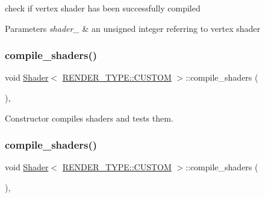check if vertex shader has been successfully compiled 


\begin{DoxyParams}{Parameters}
{\em shader\+\_\+} & an unsigned integer referring to vertex shader \\
\hline
\end{DoxyParams}
\mbox{\label{classShader_3_01RENDER__TYPE_1_1CUSTOM_01_4_aede40b234ac1e38be9d0f9f2a60a26ab}} 
\subsubsection{\texorpdfstring{compile\+\_\+shaders()}{compile\_shaders()}\hspace{0.1cm}{\footnotesize\ttfamily [1/2]}}
{\footnotesize\ttfamily void \mbox{\hyperlink{classShader}{Shader}}$<$ \mbox{\hyperlink{shader__class_8hpp_a24e288e18eb7b6e01de7565001fedb60a72baef04098f035e8a320b03ad197818}{R\+E\+N\+D\+E\+R\+\_\+\+T\+Y\+P\+E\+::\+C\+U\+S\+T\+OM}} $>$\+::compile\+\_\+shaders (\begin{DoxyParamCaption}{ }\end{DoxyParamCaption})\hspace{0.3cm}{\ttfamily [inline]}, {\ttfamily [protected]}}



Constructor compiles shaders and tests them. 

\mbox{\label{classShader_3_01RENDER__TYPE_1_1CUSTOM_01_4_aede40b234ac1e38be9d0f9f2a60a26ab}} 
\subsubsection{\texorpdfstring{compile\+\_\+shaders()}{compile\_shaders()}\hspace{0.1cm}{\footnotesize\ttfamily [2/2]}}
{\footnotesize\ttfamily void \mbox{\hyperlink{classShader}{Shader}}$<$ \mbox{\hyperlink{shader__class_8hpp_a24e288e18eb7b6e01de7565001fedb60a72baef04098f035e8a320b03ad197818}{R\+E\+N\+D\+E\+R\+\_\+\+T\+Y\+P\+E\+::\+C\+U\+S\+T\+OM}} $>$\+::compile\+\_\+shaders (\begin{DoxyParamCaption}{ }\end{DoxyParamCaption})\hspace{0.3cm}{\ttfamily [inline]}, {\ttfamily [protected]}}



